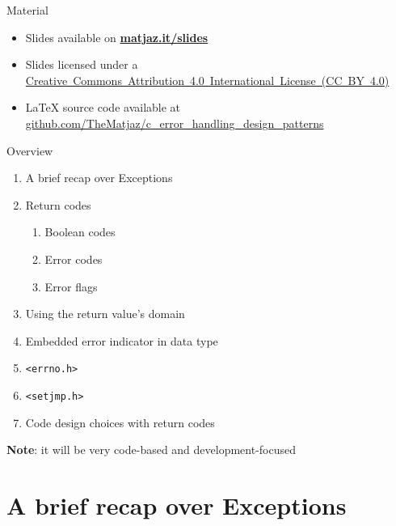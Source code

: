 \documentclass[aspectratio=169,14pt]{beamer}
\begin{document}
\begin{frame}
\titlepage
\end{frame}



\begin{frame}[label=material]{Material}
\begin{itemize}
    \item Slides available on \href{https://matjaz.it/slides/}{\textbf{matjaz.it/slides}} 
    \item Slides licensed under a 
    \href{https://creativecommons.org/licenses/by/4.0/}{Creative~Commons~Attribution~4.0~International~License~(CC~BY~4.0)}
    \item LaTeX source code available at
    \href{https://github.com/TheMatjaz/c_error_handling_design_patterns}{github.com/TheMatjaz/c\_error\_handling\_design\_patterns}
\end{itemize}
\end{frame}



\begin{frame}{Overview}
\begin{enumerate}
    \item A brief recap over Exceptions
    \item Return codes\\
    \begin{enumerate}
        \item Boolean codes
        \item Error codes
        \item Error flags
    \end{enumerate}
    \item Using the return value's domain
    \item Embedded error indicator in data type
    \item \texttt{<errno.h>}
    \item \texttt{<setjmp.h>}
    \item Code design choices with return codes
\end{enumerate}

\textbf{Note}: it will be very code-based and development-focused
\end{frame}





\section{A brief recap over Exceptions}
\end{document}

